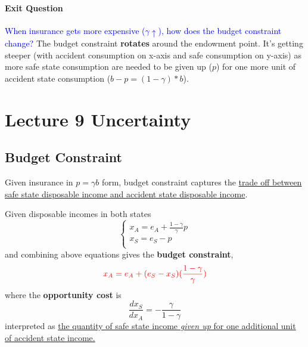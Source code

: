\documentclass[]{article}
\begin{document}
            \paragraph{Exit Question}
            \textcolor{blue}{When insurance gets more expensive ($\gamma \uparrow$), how does the budget constraint change?} The budget constraint \textbf{rotates} around the endowment point. It's getting steeper (with accident consumption on x-axis and safe consumption on y-axis) as more safe state consumption are needed to be given up ($p$) for one more unit of accident state consumption ($b - p = (1 - \gamma)*b$).
    
    \section{Lecture 9 Uncertainty}
        \subsection{Budget Constraint}
            \begin{remark} Given insurance in $p = \gamma b$ form, budget constraint captures the \ul{trade off between safe state disposable income and accident state disposable income}.
            \end{remark}
            \par Given disposable incomes in both states
            \[
                \begin{cases}
                    x_A = e_A + \frac{1 - \gamma}{\gamma}p\\
                    x_S = e_S - p \\
                \end{cases}
            \]
            and combining above equations gives the \textbf{budget constraint},
            \[
                \textcolor{red}{
                    x_A = e_A + (e_S - x_S)(\frac{1 - \gamma}{\gamma})
                    }
            \]
            where the \textbf{opportunity cost} is 
            \[
                \frac{dx_S}{dx_A} = - \frac{\gamma}{1 - \gamma} 
            \]
            interpreted as \ul{the quantity of safe state income \emph{given up} for one additional unit of accident state income.}
            
\end{document}
